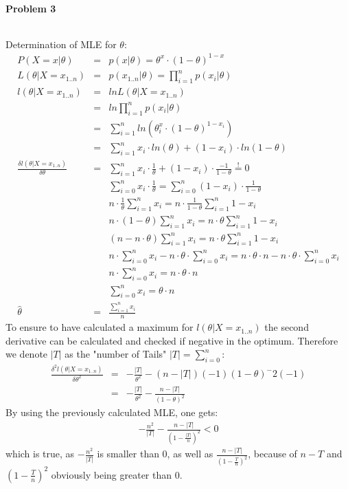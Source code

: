 \documentclass{article}
\begin{document}
\paragraph*{Problem 3}
$\;$ 

Determination of MLE for $\theta$:
\begin{eqnarray}
P(X=x | \theta) &=& p(x|\theta) = \theta^x \cdot (1-\theta)^{1-x}\\
L(\theta | X = x_{1 .. n}) &=& p(x_{1 .. n} | \theta) = \prod_{i=1}^{n} p(x_i | \theta)\\
l(\theta | X = x_{1 .. n}) &=& ln L(\theta | X = x_{1 .. n})\\
 &=& ln \prod_{i=1}^{n} p(x_i | \theta)\\
 &=& \sum_{i=1}^{n} ln (\theta ^x_i \cdot (1-\theta)^{1-x_i})\\
 &=& \sum_{i=1}^{n} x_i \cdot ln(\theta) + (1-x_i) \cdot ln(1-\theta)\\
\frac{\delta l(\theta | X = x_{1 .. n})}{\delta \theta} &=& \sum_{i=1}^n x_i \cdot \frac{1}{\theta} + (1-x_i) \cdot \frac{-1}{1-\theta} \overset{!}{=} 0\\
&& \sum_{i=0}^n x_i \cdot \frac{1}{\theta} = \sum_{i=0}^n (1-x_i) \cdot \frac{1}{1-\theta} \\
&& n \cdot \frac{1}{\theta} \sum_{i=1}^n x_i = n \cdot \frac{1}{1-\theta} \sum_{i=1}^n 1-x_i\\
&& n \cdot (1-\theta) \sum_{i=1}^n x_i = n \cdot \theta \sum_{i=1}^n 1-x_i\\
&& (n-n\cdot \theta) \sum_{i=1}^n x_i = n \cdot \theta \sum_{i=1}^n 1-x_i\\
&& n \cdot \sum_{i=0}^n x_i - n \cdot \theta \cdot \sum_{i=0}^n x_i= n \cdot \theta \cdot n - n \cdot \theta \cdot \sum_{i=0}^n x_i\\
&& n \cdot \sum_{i=0}^n x_i = n \cdot \theta \cdot n\\
&& \sum_{i=0}^n  x_i = \theta \cdot n\\
\hat{\theta} &=& \frac{\sum_{i=1}^n x_i}{n}
\end{eqnarray}
To ensure to have calculated a maximum for $l(\theta | X = x_{1 .. n})$ the second derivative can be calculated and checked if negative in the optimum. Therefore we denote $|T|$ as the "number of Tails" $|T|=\sum_{i=0}^n$:
\begin{eqnarray}
\frac{\delta^2 l(\theta | X = x_{1 .. n})}{\delta \theta^2} &=& -\frac{|T|}{\theta^2} - (n-|T|)(-1)(1-\theta)^-2(-1)\\
&=& -\frac{|T|}{\theta^2} - \frac{n-|T|}{(1-\theta)^2}
\end{eqnarray}
By using the previously calculated MLE, one gets:
\begin{eqnarray}
-\frac{n^2}{|T|}-\frac{n-|T|}{(1-\frac{|T|}{n})^2} <0
\end{eqnarray}
which is true, as $-\frac{n^2}{|T|}$ is smaller than 0, as well as $\frac{n-|T|}{(1-\frac{T}{n})^2}$, because of $n-T$ and $(1-\frac{T}{n})^2$ obviously being greater than 0.
\end{document}
